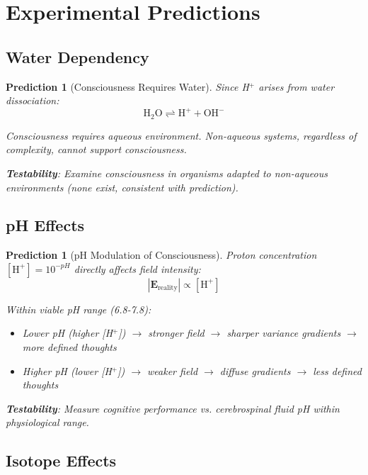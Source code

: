 \documentclass[12pt,a4paper]{article}
\newtheorem{prediction}[theorem]{Prediction}
\begin{document}
\section{Experimental Predictions}

\subsection{Water Dependency}

\begin{prediction}[Consciousness Requires Water]\label{pred:water}
Since H$^+$ arises from water dissociation:
\begin{equation}
\text{H}_2\text{O} \rightleftharpoons \text{H}^+ + \text{OH}^-
\end{equation}

Consciousness requires aqueous environment. Non-aqueous systems, regardless of complexity, cannot support consciousness.

\textbf{Testability}: Examine consciousness in organisms adapted to non-aqueous environments (none exist, consistent with prediction).
\end{prediction}

\subsection{pH Effects}

\begin{prediction}[pH Modulation of Consciousness]
Proton concentration $[\text{H}^+] = 10^{-pH}$ directly affects field intensity:
\begin{equation}
|\mathbf{E}_{\text{reality}}| \propto [\text{H}^+]
\end{equation}

Within viable pH range (6.8-7.8):
\begin{itemize}
\item Lower pH (higher [H$^+$]) $\rightarrow$ stronger field $\rightarrow$ sharper variance gradients $\rightarrow$ more defined thoughts
\item Higher pH (lower [H$^+$]) $\rightarrow$ weaker field $\rightarrow$ diffuse gradients $\rightarrow$ less defined thoughts
\end{itemize}

\textbf{Testability}: Measure cognitive performance vs. cerebrospinal fluid pH within physiological range.
\end{prediction}

\subsection{Isotope Effects}
\end{document}
